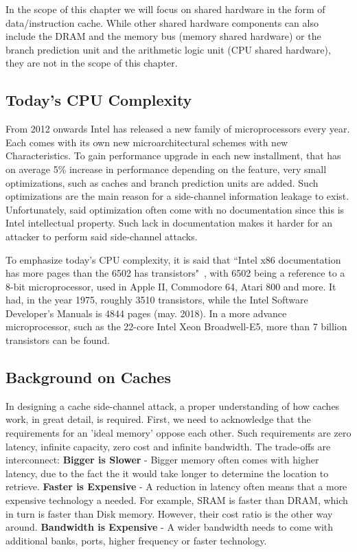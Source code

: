 In the scope of this chapter we will focus on shared hardware in the form of data/instruction cache. While other shared hardware components can also include the DRAM and the memory bus (memory shared hardware) or the branch prediction unit and the arithmetic logic unit (CPU shared hardware), they are not in the scope of this chapter.

\subsection{Today's CPU Complexity}
\label{subsec:todaycpucomplex}
From 2012 onwards Intel has released a new family of microprocessors every year. Each comes with its own new microarchitectural schemes with new Characteristics. To gain performance upgrade in each new installment, that has on average 5\% increase in performance depending on the feature, very small optimizations, such as caches and branch prediction units are added. Such optimizations are the main reason for a side-channel information leakage to exist. Unfortunately, said optimization often come with no documentation since this is Intel intellectual property. Such lack in documentation makes it harder for an attacker to perform said side-channel attacks.

To emphasize today's CPU complexity, it is said that ``Intel x86 documentation has more pages than the 6502 has transistors"~\cite{IntMan}, with 6502 being a reference to a 8-bit microprocessor, used in Apple II, Commodore 64, Atari 800 and more. It had, in the year 1975, roughly 3510 transistors, while the Intel Software Developer's Manuals is 4844 pages (may. 2018). In a more advance microprocessor, such as the 22-core Intel Xeon Broadwell-E5, more than 7 billion transistors can be found. 

\subsection{Background on Caches}
\label{subsec:backgroundoncaches}
In designing a cache side-channel attack, a proper understanding of how caches work, in great detail, is required. First, we need to acknowledge that the requirements for an 'ideal memory' oppose each other. Such requirements are zero latency, infinite capacity, zero cost and infinite bandwidth. The trade-offs are interconnect: \textbf{Bigger is Slower} - Bigger memory often comes with higher latency, due to the fact the it would take longer to determine the location to retrieve.  \textbf{Faster is Expensive} - A reduction in latency often means that a more expensive technology a needed. For example, SRAM is faster than DRAM, which in turn is faster than Disk memory. However, their cost ratio is the other way around. \textbf{Bandwidth is Expensive} - A wider bandwidth needs to come with additional banks, ports, higher frequency or faster technology. 

